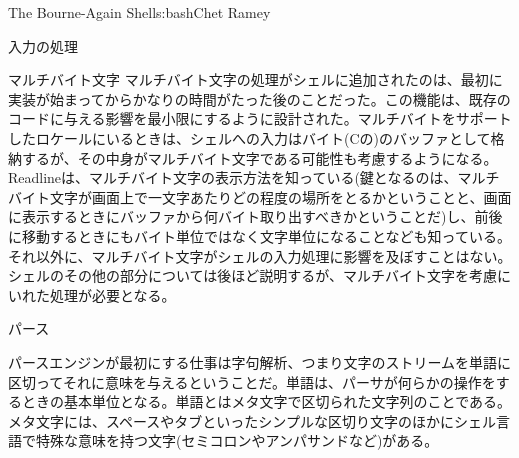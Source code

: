 \begin{aosachapter}{The Bourne-Again Shell}{s:bash}{Chet Ramey}
\begin{aosasect1}{入力の処理}
\begin{aosasect2}{マルチバイト文字}
マルチバイト文字の処理がシェルに追加されたのは、最初に実装が始まってからかなりの時間がたった後のことだった。この機能は、既存のコードに与える影響を最小限にするように設計された。マルチバイトをサポートしたロケールにいるときは、シェルへの入力はバイト(Cの)のバッファとして格納するが、その中身がマルチバイト文字である可能性も考慮するようになる。Readlineは、マルチバイト文字の表示方法を知っている(鍵となるのは、マルチバイト文字が画面上で一文字あたりどの程度の場所をとるかということと、画面に表示するときにバッファから何バイト取り出すべきかということだ)し、前後に移動するときにもバイト単位ではなく文字単位になることなども知っている。それ以外に、マルチバイト文字がシェルの入力処理に影響を及ぼすことはない。シェルのその他の部分については後ほど説明するが、マルチバイト文字を考慮にいれた処理が必要となる。

\end{aosasect2}

\end{aosasect1}

\begin{aosasect1}{パース}

パースエンジンが最初にする仕事は字句解析、つまり文字のストリームを単語に区切ってそれに意味を与えるということだ。単語は、パーサが何らかの操作をするときの基本単位となる。単語とはメタ文字で区切られた文字列のことである。メタ文字には、スペースやタブといったシンプルな区切り文字のほかにシェル言語で特殊な意味を持つ文字(セミコロンやアンパサンドなど)がある。


\end{aosasect1}
\end{aosachapter}
